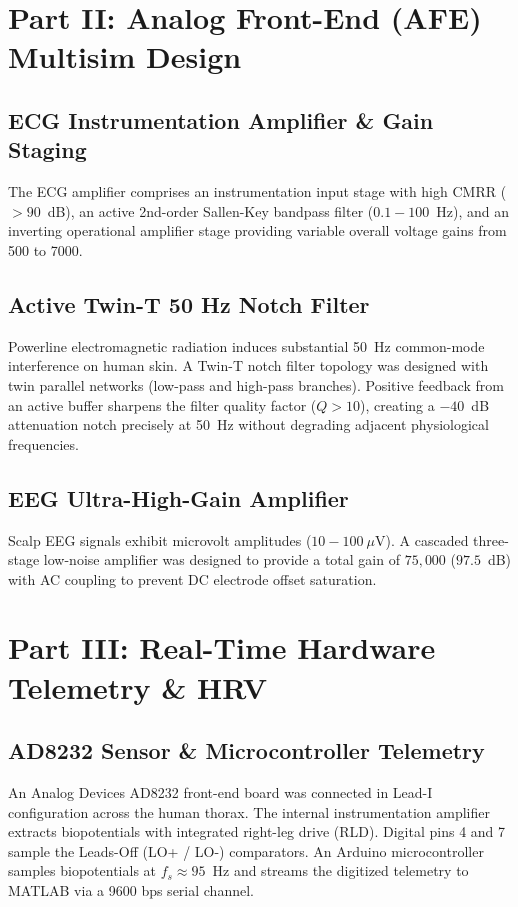 \documentclass[journal,10pt,twocolumn]{IEEEtran}
\begin{document}
\section{Part II: Analog Front-End (AFE) Multisim Design}
\subsection{ECG Instrumentation Amplifier \& Gain Staging}
The ECG amplifier comprises an instrumentation input stage with high CMRR ($> 90$~dB), an active 2nd-order Sallen-Key bandpass filter ($0.1 - 100$~Hz), and an inverting operational amplifier stage providing variable overall voltage gains from 500 to 7000.

\subsection{Active Twin-T 50 Hz Notch Filter}
Powerline electromagnetic radiation induces substantial 50~Hz common-mode interference on human skin. A Twin-T notch filter topology was designed with twin parallel networks (low-pass and high-pass branches). Positive feedback from an active buffer sharpens the filter quality factor ($Q > 10$), creating a $-40$~dB attenuation notch precisely at 50~Hz without degrading adjacent physiological frequencies.

\subsection{EEG Ultra-High-Gain Amplifier}
Scalp EEG signals exhibit microvolt amplitudes ($10 - 100~\mu\text{V}$). A cascaded three-stage low-noise amplifier was designed to provide a total gain of $75,000$ ($97.5$~dB) with AC coupling to prevent DC electrode offset saturation.

\section{Part III: Real-Time Hardware Telemetry \& HRV}
\subsection{AD8232 Sensor \& Microcontroller Telemetry}
An Analog Devices AD8232 front-end board was connected in Lead-I configuration across the human thorax. The internal instrumentation amplifier extracts biopotentials with integrated right-leg drive (RLD). Digital pins 4 and 7 sample the Leads-Off (LO+ / LO-) comparators. An Arduino microcontroller samples biopotentials at $f_s \approx 95$~Hz and streams the digitized telemetry to MATLAB via a 9600 bps serial channel.
\end{document}
